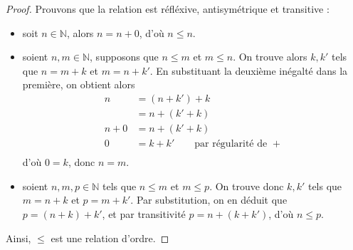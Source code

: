 \begin{proof}
  Prouvons que la relation est réfléxive, antisymétrique et transitive :
  \begin{itemize}
  \item soit $n\in \mathbb N$, alors $n = n + 0$, d'où $n\leq n$.
  \item soient $n,m\in \mathbb N$, supposons que $n \leq m$ et $m \leq n$. On
    trouve alors $k,k'$ tels que $n = m + k$ et $m = n + k'$. En substituant
    la deuxième inégalté dans la première, on obtient alors
    \begin{align*}
      n &= (n + k') + k\\
      &= n + (k' + k)\\
      n + 0 &= n + (k' + k)\\
      0 &= k + k'\qquad\text{par régularité de }+\\
    \end{align*}
    d'où $0 = k$, donc $n = m$.
  \item soient $n,m,p\in \mathbb N$ tels que $n\leq m$ et $m\leq p$. On trouve
    donc $k,k'$ tels que $m = n + k$ et $p = m + k'$. Par substitution, on en
    déduit que $p = (n + k) + k'$, et par transitivité $p = n + (k + k')$, d'où
    $n \leq p$.
  \end{itemize}
  Ainsi, $\leq$ est une relation d'ordre.
\end{proof}
